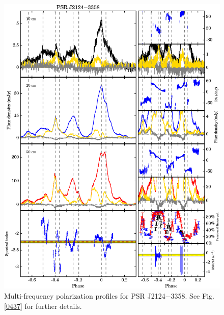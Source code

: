 \documentclass[useAMS,usenatbib]{mn2e}
\begin{document}
\begin{appendices}
\begin{figure}
\begin{center}
\includegraphics[width=6 in]{2124.ps}
\caption{Multi-frequency polarization profiles for PSR J2124$-$3358. 
See Fig. \ref{0437} for further details.}
\label{2124}
\end{center}
\end{figure}


\end{appendices}
\end{document}
